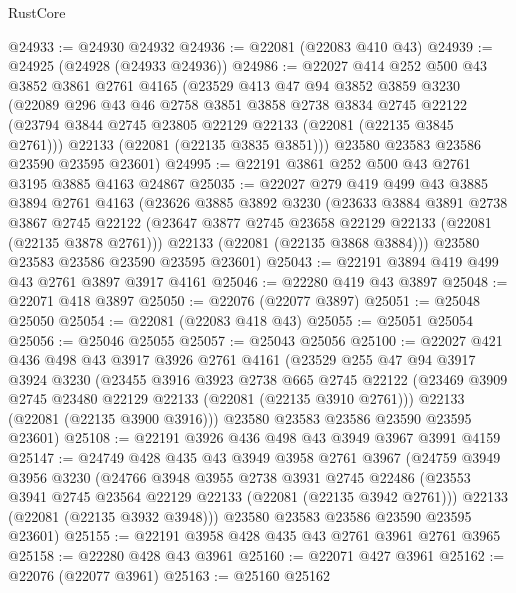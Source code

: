 \begin{lexlean}{RustCore}
\begin{coremodule}
@24933 := @24930 @24932
@24936 := @22081 (@22083 @410 @43)
@24939 := @24925 (@24928 (@24933 @24936))
@24986 := @22027
    @414
    @252
    @500
    @43
    @3852
    @3861
    @2761
    @4165
    (@23529
      @413
      @47
      @94
      @3852
      @3859
      @3230
      (@22089
        @296
        @43
        @46
        @2758
        @3851
        @3858
        @2738
        @3834
        @2745
        @22122
        (@23794 @3844 @2745 @23805 @22129 @22133 (@22081 (@22135 @3845 @2761)))
        @22133
        (@22081 (@22135 @3835 @3851)))
      @23580
      @23583
      @23586
      @23590
      @23595
      @23601)
@24995 := @22191 @3861 @252 @500 @43 @2761 @3195 @3885 @4163 @24867
@25035 := @22027
    @279
    @419
    @499
    @43
    @3885
    @3894
    @2761
    @4163
    (@23626
      @3885
      @3892
      @3230
      (@23633
        @3884
        @3891
        @2738
        @3867
        @2745
        @22122
        (@23647 @3877 @2745 @23658 @22129 @22133 (@22081 (@22135 @3878 @2761)))
        @22133
        (@22081 (@22135 @3868 @3884)))
      @23580
      @23583
      @23586
      @23590
      @23595
      @23601)
@25043 := @22191 @3894 @419 @499 @43 @2761 @3897 @3917 @4161
@25046 := @22280 @419 @43 @3897
@25048 := @22071 @418 @3897
@25050 := @22076 (@22077 @3897)
@25051 := @25048 @25050
@25054 := @22081 (@22083 @418 @43)
@25055 := @25051 @25054
@25056 := @25046 @25055
@25057 := @25043 @25056
@25100 := @22027
    @421
    @436
    @498
    @43
    @3917
    @3926
    @2761
    @4161
    (@23529
      @255
      @47
      @94
      @3917
      @3924
      @3230
      (@23455
        @3916
        @3923
        @2738
        @665
        @2745
        @22122
        (@23469 @3909 @2745 @23480 @22129 @22133 (@22081 (@22135 @3910 @2761)))
        @22133
        (@22081 (@22135 @3900 @3916)))
      @23580
      @23583
      @23586
      @23590
      @23595
      @23601)
@25108 := @22191 @3926 @436 @498 @43 @3949 @3967 @3991 @4159
@25147 := @24749
    @428
    @435
    @43
    @3949
    @3958
    @2761
    @3967
    (@24759
      @3949
      @3956
      @3230
      (@24766
        @3948
        @3955
        @2738
        @3931
        @2745
        @22486
        (@23553 @3941 @2745 @23564 @22129 @22133 (@22081 (@22135 @3942 @2761)))
        @22133
        (@22081 (@22135 @3932 @3948)))
      @23580
      @23583
      @23586
      @23590
      @23595
      @23601)
@25155 := @22191 @3958 @428 @435 @43 @2761 @3961 @2761 @3965
@25158 := @22280 @428 @43 @3961
@25160 := @22071 @427 @3961
@25162 := @22076 (@22077 @3961)
@25163 := @25160 @25162

\end{coremodule}
\end{lexlean}

